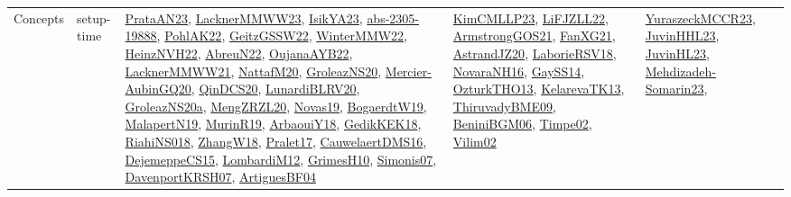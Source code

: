 {\begin{longtable}{lp{3cm}>{\raggedright}p{6cm}>{\raggedright}p{6cm}p{8cm}}
Concepts & setup-time & \href{articles/PrataAN23.pdf}{PrataAN23}\cite{PrataAN23}, \href{articles/LacknerMMWW23.pdf}{LacknerMMWW23}\cite{LacknerMMWW23}, \href{articles/IsikYA23.pdf}{IsikYA23}\cite{IsikYA23}, \href{articles/abs-2305-19888.pdf}{abs-2305-19888}\cite{abs-2305-19888}, \href{articles/PohlAK22.pdf}{PohlAK22}\cite{PohlAK22}, \href{papers/GeitzGSSW22.pdf}{GeitzGSSW22}\cite{GeitzGSSW22}, \href{papers/WinterMMW22.pdf}{WinterMMW22}\cite{WinterMMW22}, \href{articles/HeinzNVH22.pdf}{HeinzNVH22}\cite{HeinzNVH22}, \href{articles/AbreuN22.pdf}{AbreuN22}\cite{AbreuN22}, \href{papers/OujanaAYB22.pdf}{OujanaAYB22}\cite{OujanaAYB22}, \href{papers/LacknerMMWW21.pdf}{LacknerMMWW21}\cite{LacknerMMWW21}, \href{papers/NattafM20.pdf}{NattafM20}\cite{NattafM20}, \href{papers/GroleazNS20.pdf}{GroleazNS20}\cite{GroleazNS20}, \href{papers/Mercier-AubinGQ20.pdf}{Mercier-AubinGQ20}\cite{Mercier-AubinGQ20}, \href{articles/QinDCS20.pdf}{QinDCS20}\cite{QinDCS20}, \href{articles/LunardiBLRV20.pdf}{LunardiBLRV20}\cite{LunardiBLRV20}, \href{papers/GroleazNS20a.pdf}{GroleazNS20a}\cite{GroleazNS20a}, \href{articles/MengZRZL20.pdf}{MengZRZL20}\cite{MengZRZL20}, \href{articles/Novas19.pdf}{Novas19}\cite{Novas19}, \href{papers/BogaerdtW19.pdf}{BogaerdtW19}\cite{BogaerdtW19}, \href{papers/MalapertN19.pdf}{MalapertN19}\cite{MalapertN19}, \href{papers/MurinR19.pdf}{MurinR19}\cite{MurinR19}, \href{papers/ArbaouiY18.pdf}{ArbaouiY18}\cite{ArbaouiY18}, \href{articles/GedikKEK18.pdf}{GedikKEK18}\cite{GedikKEK18}, \href{papers/RiahiNS018.pdf}{RiahiNS018}\cite{RiahiNS018}, \href{articles/ZhangW18.pdf}{ZhangW18}\cite{ZhangW18}, \href{papers/Pralet17.pdf}{Pralet17}\cite{Pralet17}, \href{papers/CauwelaertDMS16.pdf}{CauwelaertDMS16}\cite{CauwelaertDMS16}, \href{papers/DejemeppeCS15.pdf}{DejemeppeCS15}\cite{DejemeppeCS15}, \href{articles/LombardiM12.pdf}{LombardiM12}\cite{LombardiM12}, \href{papers/GrimesH10.pdf}{GrimesH10}\cite{GrimesH10}, \href{articles/Simonis07.pdf}{Simonis07}\cite{Simonis07}, \href{papers/DavenportKRSH07.pdf}{DavenportKRSH07}\cite{DavenportKRSH07}, \href{papers/ArtiguesBF04.pdf}{ArtiguesBF04}\cite{ArtiguesBF04} & \href{papers/KimCMLLP23.pdf}{KimCMLLP23}\cite{KimCMLLP23}, \href{papers/LiFJZLL22.pdf}{LiFJZLL22}\cite{LiFJZLL22}, \href{papers/ArmstrongGOS21.pdf}{ArmstrongGOS21}\cite{ArmstrongGOS21}, \href{articles/FanXG21.pdf}{FanXG21}\cite{FanXG21}, \href{articles/AstrandJZ20.pdf}{AstrandJZ20}\cite{AstrandJZ20}, \href{articles/LaborieRSV18.pdf}{LaborieRSV18}\cite{LaborieRSV18}, \href{articles/NovaraNH16.pdf}{NovaraNH16}\cite{NovaraNH16}, \href{papers/GaySS14.pdf}{GaySS14}\cite{GaySS14}, \href{articles/OzturkTHO13.pdf}{OzturkTHO13}\cite{OzturkTHO13}, \href{papers/KelarevaTK13.pdf}{KelarevaTK13}\cite{KelarevaTK13}, \href{papers/ThiruvadyBME09.pdf}{ThiruvadyBME09}\cite{ThiruvadyBME09}, \href{papers/BeniniBGM06.pdf}{BeniniBGM06}\cite{BeniniBGM06}, \href{articles/Timpe02.pdf}{Timpe02}\cite{Timpe02}, \href{papers/Vilim02.pdf}{Vilim02}\cite{Vilim02} & \href{articles/YuraszeckMCCR23.pdf}{YuraszeckMCCR23}\cite{YuraszeckMCCR23}, \href{papers/JuvinHHL23.pdf}{JuvinHHL23}\cite{JuvinHHL23}, \href{papers/JuvinHL23.pdf}{JuvinHL23}\cite{JuvinHL23}, \href{papers/Mehdizadeh-Somarin23.pdf}{Mehdizadeh-Somarin23}\cite{Mehdizadeh-Somarin23}, 
\end{longtable}}
